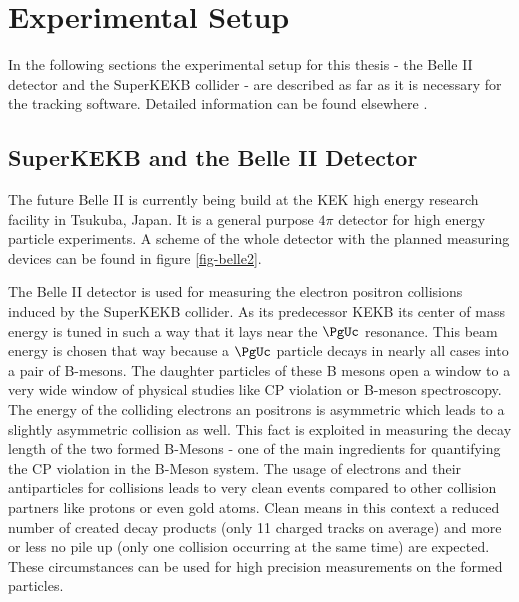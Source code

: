 \chapter{Experimental Setup}
In the following sections the experimental setup for this thesis - the Belle II detector and the SuperKEKB collider - are described as far as it is necessary for the tracking software. Detailed information can be found elsewhere \cite{tdr}.


\section{SuperKEKB and the Belle II Detector}

The future Belle II is currently being build at the KEK high energy research facility in Tsukuba, Japan. It is a general purpose $4\pi$ detector for high energy particle experiments. A scheme of the whole detector with the planned measuring devices can be found in figure \ref{fig-belle2}.

The Belle II detector is used for measuring the electron positron collisions induced by the SuperKEKB collider. As its predecessor KEKB its center of mass energy is tuned in such a way that it lays near the $\PgUc$ resonance. This beam energy is chosen that way because a $\PgUc$ particle decays in nearly all cases into a pair of B-mesons. The daughter particles of these B mesons open a window to a very wide window of physical studies like CP violation or B-meson spectroscopy. The energy of the colliding electrons an positrons is asymmetric which leads to a slightly asymmetric collision as well. This fact is exploited in measuring the decay length of the two formed B-Mesons - one of the main ingredients for quantifying the CP violation in the B-Meson system. The usage of electrons and their antiparticles for collisions leads to very clean events compared to other collision partners like protons or even gold atoms. Clean means in this context a reduced number of created decay products (only 11 charged tracks on average) and more or less no pile up (only one collision occurring at the same time) are expected. These circumstances can be used for high precision measurements on the formed particles.

